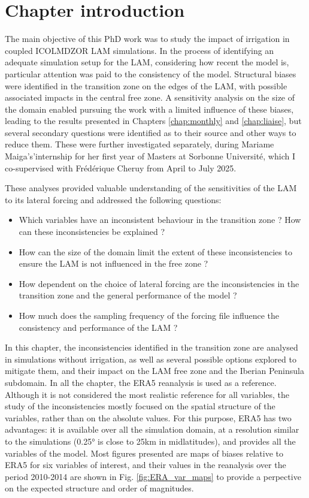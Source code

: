 \section{Chapter introduction}

The main objective of this PhD work was to study the impact of irrigation in coupled ICOLMDZOR LAM simulations.
In the process of identifying an adequate simulation setup for the LAM, considering how recent the model is, particular attention was paid to the consistency of the model. 
Structural biases were identified in the transition zone on the edges of the LAM, with possible associated impacts in the central free zone. 
A sensitivity analysis on the size of the domain enabled pursuing the work with a limited influence of these biases, leading to the results presented in Chapters \ref{chap:monthly} and \ref{chap:liaise}, but several secondary questions were identified as to their source and other ways to reduce them. 
These were further investigated separately, during Mariame Maiga's'internship for her first year of Masters at Sorbonne Université, which I co-supervised with Frédérique Cheruy from April to July 2025. 

These analyses provided valuable understanding of the sensitivities of the LAM to its lateral forcing and addressed the following questions: 
\begin{itemize}
    \item Which variables have an inconsistent behaviour in the transition zone ? How can these inconsistencies be explained ?
    \item How can the size of the domain limit the extent of these inconsistencies to ensure the LAM is not influenced in the free zone ?
    \item How dependent on the choice of lateral forcing are the inconsistencies in the transition zone and the general performance of the model ?
    \item How much does the sampling frequency of the forcing file influence the consistency and performance of the LAM ?
\end{itemize}

In this chapter, the inconsistencies identified in the transition zone are analysed in simulations without irrigation, as well as several possible options explored to mitigate them, and their impact on the LAM free zone and the Iberian Peninsula subdomain. 
In all the chapter, the ERA5 reanalysis is used as a reference. Although it is not considered the most realistic reference for all variables, the study of the inconsistencies mostly focused on the spatial structure of the variables, rather than on the absolute values.
For this purpose, ERA5 has two advantages: it is available over all the simulation domain, at a resolution similar to the simulations (0.25° is close to 25km in midlatitudes), and provides all the variables of the model.
Most figures presented are maps of biases relative to ERA5 for six variables of interest, and their values in the reanalysis over the period 2010-2014 are shown in Fig. \ref{fig:ERA_var_maps} to provide a perpective on the expected structure and order of magnitudes.

